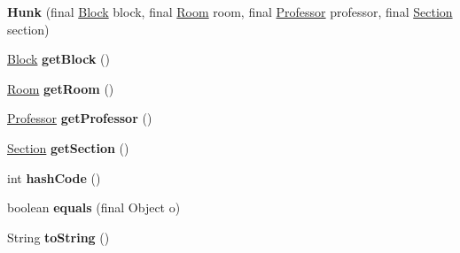\begin{DoxyCompactItemize}
\item 
\hypertarget{classosd_1_1output_1_1_hunk_a15b10a7f8b23e9e29355e125ca12ee3a}{{\bfseries Hunk} (final \hyperlink{interfaceosd_1_1input_1_1_block}{Block} block, final \hyperlink{interfaceosd_1_1input_1_1_room}{Room} room, final \hyperlink{interfaceosd_1_1input_1_1_professor}{Professor} professor, final \hyperlink{interfaceosd_1_1input_1_1_section}{Section} section)}\label{classosd_1_1output_1_1_hunk_a15b10a7f8b23e9e29355e125ca12ee3a}

\item 
\hypertarget{classosd_1_1output_1_1_hunk_a58a55628703e1f9ac88f14f0cbf09bcb}{\hyperlink{interfaceosd_1_1input_1_1_block}{Block} {\bfseries get\-Block} ()}\label{classosd_1_1output_1_1_hunk_a58a55628703e1f9ac88f14f0cbf09bcb}

\item 
\hypertarget{classosd_1_1output_1_1_hunk_aec452e382d14f30e6da72e63e647eae3}{\hyperlink{interfaceosd_1_1input_1_1_room}{Room} {\bfseries get\-Room} ()}\label{classosd_1_1output_1_1_hunk_aec452e382d14f30e6da72e63e647eae3}

\item 
\hypertarget{classosd_1_1output_1_1_hunk_aad86f22e8a5009d281d3a3ca0bf0f823}{\hyperlink{interfaceosd_1_1input_1_1_professor}{Professor} {\bfseries get\-Professor} ()}\label{classosd_1_1output_1_1_hunk_aad86f22e8a5009d281d3a3ca0bf0f823}

\item 
\hypertarget{classosd_1_1output_1_1_hunk_a4ae048a129a226f5e0f90d42a1fb9070}{\hyperlink{interfaceosd_1_1input_1_1_section}{Section} {\bfseries get\-Section} ()}\label{classosd_1_1output_1_1_hunk_a4ae048a129a226f5e0f90d42a1fb9070}

\item 
\hypertarget{classosd_1_1output_1_1_hunk_add37c82837cda95f356962de06d0c8eb}{int {\bfseries hash\-Code} ()}\label{classosd_1_1output_1_1_hunk_add37c82837cda95f356962de06d0c8eb}

\item 
\hypertarget{classosd_1_1output_1_1_hunk_a843591462a1402c08cb41c2c598c1ad7}{boolean {\bfseries equals} (final Object o)}\label{classosd_1_1output_1_1_hunk_a843591462a1402c08cb41c2c598c1ad7}

\item 
\hypertarget{classosd_1_1output_1_1_hunk_a5d3057c83b319668ddee8a9dcd7204f3}{String {\bfseries to\-String} ()}\label{classosd_1_1output_1_1_hunk_a5d3057c83b319668ddee8a9dcd7204f3}

\end{DoxyCompactItemize}


